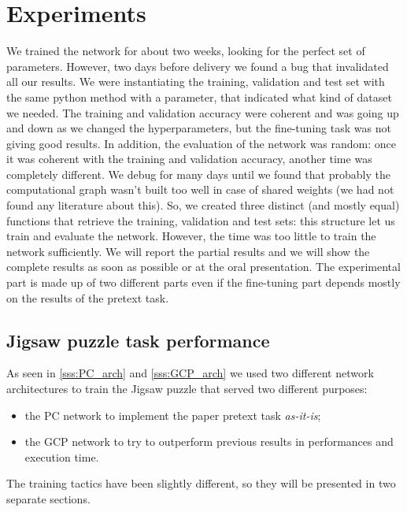 \section{Experiments}\label{s:experiments}
We trained the network for about two weeks, looking for the perfect set of parameters. However, two days before delivery we found a bug that invalidated all our results. We were instantiating the training, validation and test set with the same python method with a parameter, that indicated what kind of dataset we needed. The training and validation accuracy were coherent and was going up and down as we changed the hyperparameters, but the fine-tuning task was not giving good results. In addition, the evaluation of the network was random: once it was coherent with the training and validation accuracy, another time was completely different. We debug for many days until we found that probably the computational graph wasn't built too well in case of shared weights (we had not found any literature about this). So, we created three distinct (and mostly equal) functions that retrieve the training, validation and test sets: this structure let us train and evaluate the network. However, the time was too little to train the network sufficiently. We will report the partial results and we will show the complete results as soon as possible or at the oral presentation.\newline
The experimental part is made up of two different parts even if the fine-tuning part depends mostly on the results of the pretext task. 


\subsection{Jigsaw puzzle task performance}
As seen in \ref{sss:PC_arch} and \ref{sss:GCP_arch} we used two different network architectures to train the Jigsaw puzzle that served two different purposes:
\begin{itemize}
    \item the PC network to implement the paper pretext task \emph{as-it-is};
    \item the GCP network to try to outperform previous results in performances and execution time.
\end{itemize}
The training tactics have been slightly different, so they will be presented in two separate sections.


